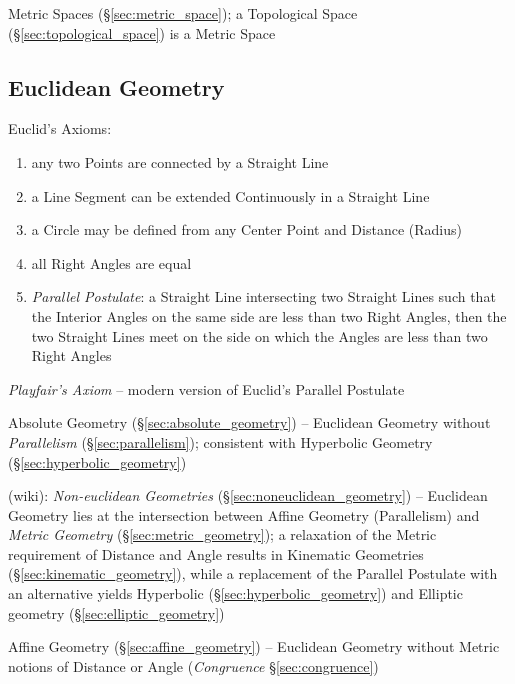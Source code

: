 Metric Spaces (\S\ref{sec:metric_space}); a Topological Space
(\S\ref{sec:topological_space}) is a Metric Space



\subsection{Euclidean Geometry}\label{sec:euclidean_geometry}

Euclid's Axioms:
\begin{enumerate}
  \item any two Points are connected by a Straight Line
  \item a Line Segment can be extended Continuously in a Straight Line
  \item a Circle may be defined from any Center Point and Distance (Radius)
  \item all Right Angles are equal
  \item \emph{Parallel Postulate}: a Straight Line intersecting two Straight
    Lines such that the Interior Angles on the same side are less than two Right
    Angles, then the two Straight Lines meet on the side on which the Angles are
    less than two Right Angles
\end{enumerate}

\emph{Playfair's Axiom} -- modern version of Euclid's Parallel Postulate

Absolute Geometry (\S\ref{sec:absolute_geometry}) -- Euclidean Geometry
without \emph{Parallelism} (\S\ref{sec:parallelism}); consistent with Hyperbolic
Geometry (\S\ref{sec:hyperbolic_geometry})

(wiki): \emph{Non-euclidean Geometries} (\S\ref{sec:noneuclidean_geometry}) --
Euclidean Geometry lies at the intersection between Affine Geometry
(Parallelism) and \emph{Metric Geometry} (\S\ref{sec:metric_geometry}); a
relaxation of the Metric requirement of Distance and Angle results in Kinematic
Geometries (\S\ref{sec:kinematic_geometry}), while a replacement of the Parallel
Postulate with an alternative yields Hyperbolic
(\S\ref{sec:hyperbolic_geometry}) and Elliptic geometry
(\S\ref{sec:elliptic_geometry})

Affine Geometry (\S\ref{sec:affine_geometry}) -- Euclidean Geometry without
Metric notions of Distance or Angle (\emph{Congruence} \S\ref{sec:congruence})

